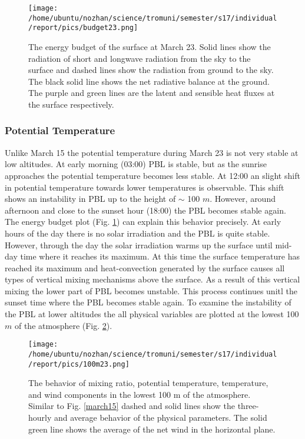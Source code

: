 \documentclass[a4paper,12pt]{article}
\numberwithin{equation}{section} %
\begin{document}
\vspace{0.35cm}

\begin{figure}[bhp]
\texttt{[image: /home/ubuntu/nozhan/science/tromuni/semester/s17/individual/report/pics/budget23.png]}
\caption{The energy budget of the surface at March 23. Solid lines show the radiation of short and longwave radiation from the sky to the surface and dashed lines show the radiation from ground to the sky. The black solid line shows the net radiative balance at the ground. The purple and green lines are the latent and sensible heat fluxes at the surface respectively.}
\label{budget23}
\end{figure}

\vspace{0.35cm}

\subsubsection{Potential Temperature}

Unlike March 15 the potential temperature during March 23 is not very stable at low altitudes. At early morning (03:00) PBL is stable, but as the sunrise approaches the potential temperature becomes less stable. At 12:00 an slight shift in potential temperature towards lower temperatures is observable. This shift shows an instability in PBL up to the height of $\sim$ 100 $m$. However, around afternoon and close to the sunset hour (18:00) the PBL becomes stable again. The energy budget plot (Fig. \ref{budget23}) can explain this behavior precisely. At early hours of the day there is no solar irradiation and the PBL is quite stable. However, through the day the solar irradiation warms up the surface until mid-day time where it reaches its maximum. At this time the surface temperature has reached its maximum and heat-convection generated by the surface causes all types of vertical mixing mechanisms above the surface. As a result of this vertical mixing the lower part of PBL becomes unstable. This process continues unitl the sunset time where the PBL becomes stable again. To examine the instability of the PBL at lower altitudes the all physical variables are plotted at the lowest 100 $m$ of the atmosphere (Fig. \ref{100m23}).

\begin{figure}[bhp]
\texttt{[image: /home/ubuntu/nozhan/science/tromuni/semester/s17/individual/report/pics/100m23.png]}
\caption{The behavior of mixing ratio, potential temperature, temperature, and wind components in the lowest 100 m of the atmosphere. Similar to Fig. \ref{march15} dashed and solid lines show the three-hourly and average behavior of the physical parameters. The solid green line shows the average of the net wind in the horizontal plane.}
\label{100m23}
\end{figure}
\end{document}

